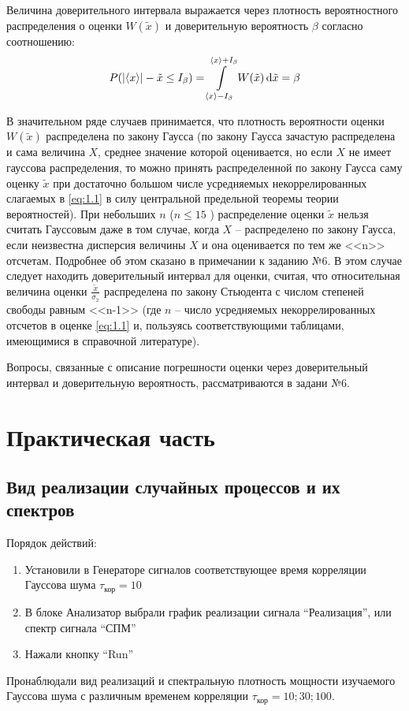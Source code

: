 \documentclass[a4paper,14pt]{extarticle}
\begin{document}
Величина доверительного интервала выражается через плотность вероятностного распределения о
оценки $W(\tilde x)$ и доверительную вероятность $\beta$ согласно соотношению:
\begin{equation}
    \label{eq:5.1}
    P\qty(\abs{\langle x\rangle} - \tilde x \leq I_{\beta}) = \int\limits_{\langle x\rangle-I_{\beta}}^{\langle x\rangle+I_{\beta}}  W(\tilde x) \dd{\tilde x} = \beta
\end{equation}

В значительном ряде случаев принимается, что плотность вероятности оценки  $W(\tilde x)$ распределена по закону Гаусса (по закону Гаусса зачастую распределена и сама величина $X$,
среднее значение которой оценивается, но если $X$ не имеет гауссова распределения, то 
можно принять распределенной по закону Гаусса саму оценку $\tilde x$  при достаточно большом числе 
усредняемых некоррелированных слагаемых в \eqref{eq:1.1}  в силу центральной предельной теоремы теории вероятностей).
При небольших $n$ ($n\leq 15$ ) распределение оценки $\tilde x$ нельзя считать 
Гауссовым даже в том случае, когда $X$ -- распределено по закону Гаусса, если 
неизвестна дисперсия величины $X$ и она оценивается по тем же <<n>> отсчетам. 
Подробнее об этом сказано в примечании к заданию №6. 
В этом случае следует находить доверительный интервал для оценки, считая, что относительная величина оценки $\frac{\tilde x}{\sigma_{\tilde x}}$ распределена по
закону Стьюдента с числом степеней свободы равным <<n-1>> (где $n$ -- число 
усредняемых некоррелированных отсчетов в оценке \eqref{eq:1.1}  и, пользуясь соответствующими таблицами, имеющимися в справочной литературе).

Вопросы, связанные с описание погрешности оценки через доверительный интервал и доверительную вероятность, рассматриваются в задани  №6.

\section{Практическая часть}
\subsection[Задание 1]{Вид реализации случайных процессов и их спектров}

Порядок действий:
\begin{enumerate}
	\item Установили в Генераторе сигналов соответствующее время корреляции Гауссова шума $\tau_\text{кор} = 10$
	\item В блоке Анализатор выбрали график реализации сигнала “Реализация”, или спектр сигнала “СПМ”
	\item Нажали кнопку “Run”
\end{enumerate}
Пронаблюдали вид реализаций и спектральную плотность мощности изучаемого Гауссова шума с различным временем корреляции $\tau_\text{кор} =10; 30; 100$.
\end{document}
